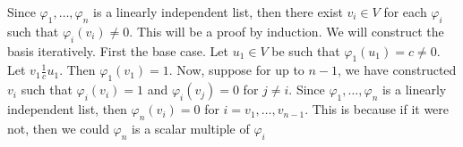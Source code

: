 \documentclass{book}
\begin{document}
\begin{enumerate}[label=\arabic*)]
    \ii
      Since $\varphi_1, \dots, \varphi_n$ is a linearly independent list, then there exist $v_i \in V$ for each $\varphi_i$ such that $\varphi_i(v_i) \neq 0$. This will be a proof by
      induction. We will construct the basis iteratively. First the base case. Let $u_1 \in V$ be such that $\varphi_1(u_1) = c \neq 0$. Let $v_1 \frac{1}{c}u_1$. Then $\varphi_1(v_1) = 1$.
      Now, suppose for up to $n - 1$, we have constructed $v_i$ such that $\varphi_i(v_i) = 1$ and $\varphi_i(v_j) = 0$ for $j \neq i$. Since $\varphi_1, \dots, \varphi_n$ is a linearly
      independent list, then $\varphi_n(v_i) = 0$ for $i = v_1, \dots, v_{n - 1}$. This is because if it were not, then we could $\varphi_n$ is a scalar multiple of $\varphi_i$ 


\end{enumerate}
\end{document}
